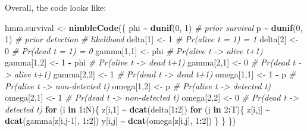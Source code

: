 \documentclass[
  12pt,
]{krantz}
\newenvironment{Shaded}{\begin{snugshade}}{\end{snugshade}}
\newcommand{\CommentTok}[1]{\textcolor[rgb]{0.56,0.35,0.01}{\textit{#1}}}
\newcommand{\ControlFlowTok}[1]{\textcolor[rgb]{0.13,0.29,0.53}{\textbf{#1}}}
\newcommand{\DecValTok}[1]{\textcolor[rgb]{0.00,0.00,0.81}{#1}}
\newcommand{\FunctionTok}[1]{\textcolor[rgb]{0.13,0.29,0.53}{\textbf{#1}}}
\newcommand{\NormalTok}[1]{#1}
\newcommand{\OtherTok}[1]{\textcolor[rgb]{0.56,0.35,0.01}{#1}}
\newcommand{\SpecialCharTok}[1]{\textcolor[rgb]{0.81,0.36,0.00}{\textbf{#1}}}
\begin{document}
Overall, the code looks like:

\begin{Shaded}
\begin{Highlighting}[]
\NormalTok{hmm.survival }\OtherTok{\textless{}{-}} \FunctionTok{nimbleCode}\NormalTok{(\{}
\NormalTok{  phi }\SpecialCharTok{\textasciitilde{}} \FunctionTok{dunif}\NormalTok{(}\DecValTok{0}\NormalTok{, }\DecValTok{1}\NormalTok{) }\CommentTok{\# prior survival}
\NormalTok{  p }\SpecialCharTok{\textasciitilde{}} \FunctionTok{dunif}\NormalTok{(}\DecValTok{0}\NormalTok{, }\DecValTok{1}\NormalTok{) }\CommentTok{\# prior detection}
  \CommentTok{\# likelihood}
\NormalTok{  delta[}\DecValTok{1}\NormalTok{] }\OtherTok{\textless{}{-}} \DecValTok{1}          \CommentTok{\# Pr(alive t = 1) = 1}
\NormalTok{  delta[}\DecValTok{2}\NormalTok{] }\OtherTok{\textless{}{-}} \DecValTok{0}          \CommentTok{\# Pr(dead t = 1) = 0}
\NormalTok{  gamma[}\DecValTok{1}\NormalTok{,}\DecValTok{1}\NormalTok{] }\OtherTok{\textless{}{-}}\NormalTok{ phi      }\CommentTok{\# Pr(alive t {-}\textgreater{} alive t+1)}
\NormalTok{  gamma[}\DecValTok{1}\NormalTok{,}\DecValTok{2}\NormalTok{] }\OtherTok{\textless{}{-}} \DecValTok{1} \SpecialCharTok{{-}}\NormalTok{ phi  }\CommentTok{\# Pr(alive t {-}\textgreater{} dead t+1)}
\NormalTok{  gamma[}\DecValTok{2}\NormalTok{,}\DecValTok{1}\NormalTok{] }\OtherTok{\textless{}{-}} \DecValTok{0}        \CommentTok{\# Pr(dead t {-}\textgreater{} alive t+1)}
\NormalTok{  gamma[}\DecValTok{2}\NormalTok{,}\DecValTok{2}\NormalTok{] }\OtherTok{\textless{}{-}} \DecValTok{1}        \CommentTok{\# Pr(dead t {-}\textgreater{} dead t+1)}
\NormalTok{  omega[}\DecValTok{1}\NormalTok{,}\DecValTok{1}\NormalTok{] }\OtherTok{\textless{}{-}} \DecValTok{1} \SpecialCharTok{{-}}\NormalTok{ p    }\CommentTok{\# Pr(alive t {-}\textgreater{} non{-}detected t)}
\NormalTok{  omega[}\DecValTok{1}\NormalTok{,}\DecValTok{2}\NormalTok{] }\OtherTok{\textless{}{-}}\NormalTok{ p        }\CommentTok{\# Pr(alive t {-}\textgreater{} detected t)}
\NormalTok{  omega[}\DecValTok{2}\NormalTok{,}\DecValTok{1}\NormalTok{] }\OtherTok{\textless{}{-}} \DecValTok{1}        \CommentTok{\# Pr(dead t {-}\textgreater{} non{-}detected t)}
\NormalTok{  omega[}\DecValTok{2}\NormalTok{,}\DecValTok{2}\NormalTok{] }\OtherTok{\textless{}{-}} \DecValTok{0}        \CommentTok{\# Pr(dead t {-}\textgreater{} detected t)}
  \ControlFlowTok{for}\NormalTok{ (i }\ControlFlowTok{in} \DecValTok{1}\SpecialCharTok{:}\NormalTok{N)\{}
\NormalTok{    z[i,}\DecValTok{1}\NormalTok{] }\SpecialCharTok{\textasciitilde{}} \FunctionTok{dcat}\NormalTok{(delta[}\DecValTok{1}\SpecialCharTok{:}\DecValTok{2}\NormalTok{])}
    \ControlFlowTok{for}\NormalTok{ (j }\ControlFlowTok{in} \DecValTok{2}\SpecialCharTok{:}\NormalTok{T)\{}
\NormalTok{      z[i,j] }\SpecialCharTok{\textasciitilde{}} \FunctionTok{dcat}\NormalTok{(gamma[z[i,j}\DecValTok{{-}1}\NormalTok{], }\DecValTok{1}\SpecialCharTok{:}\DecValTok{2}\NormalTok{])}
\NormalTok{      y[i,j] }\SpecialCharTok{\textasciitilde{}} \FunctionTok{dcat}\NormalTok{(omega[z[i,j], }\DecValTok{1}\SpecialCharTok{:}\DecValTok{2}\NormalTok{])}
\NormalTok{    \}}
\NormalTok{  \}}
\NormalTok{\})}
\end{Highlighting}
\end{Shaded}
\end{document}
